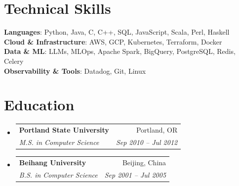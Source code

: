 \documentclass[letterpaper,11pt]{article}
\makeatletter
\newcommand{\resumeItem}[1]{
  \item\small{
    {#1 \vspace{-2pt}}
  }
}
\newcommand{\resumeSubheading}[4]{
  \vspace{-2pt}\item
    \begin{tabular*}{0.97\textwidth}[t]{l@{\extracolsep{\fill}}r}
      \textbf{#1} & #2 \\
      \textit{\small#3} & \textit{\small #4} \\
    \end{tabular*}\vspace{-7pt}
}
\newcommand{\resumeProjectHeading}[2]{
    \item
    \begin{tabular*}{0.97\textwidth}{l@{\extracolsep{\fill}}r}
      \small#1 & #2 \\
    \end{tabular*}\vspace{-7pt}
}
\newcommand{\resumeSubHeadingListStart}{\begin{itemize}[leftmargin=0.15in, label={}]}
\newcommand{\resumeSubHeadingListEnd}{\end{itemize}}
\newcommand{\resumeItemListStart}{\begin{itemize}}
\newcommand{\resumeItemListEnd}{\end{itemize}\vspace{-5pt}}
\makeatother
\begin{document}



%
\section{Technical Skills}
 \begin{itemize}[leftmargin=0.15in, label={}]
    \small{\item{
     \textbf{Languages}{: Python, Java, C, C++, SQL, JavaScript, Scala, Perl, Haskell} \\
     \textbf{Cloud \& Infrastructure}{: AWS, GCP, Kubernetes, Terraform, Docker} \\
     \textbf{Data \& ML}{: LLMs, MLOps, Apache Spark, BigQuery, PostgreSQL, Redis, Celery} \\
     \textbf{Observability \& Tools}{: Datadog, Git, Linux} \\
    }}
 \end{itemize}


\section{Education}
  \resumeSubHeadingListStart
    \resumeSubheading
      {Portland State University}{Portland, OR}
      {M.S. in Computer Science}{Sep 2010 -- Jul 2012}
    \resumeSubheading
      {Beihang University}{Beijing, China}
      {B.S. in Computer Science}{Sep 2001 -- Jul 2005}
  \resumeSubHeadingListEnd


\end{document}

